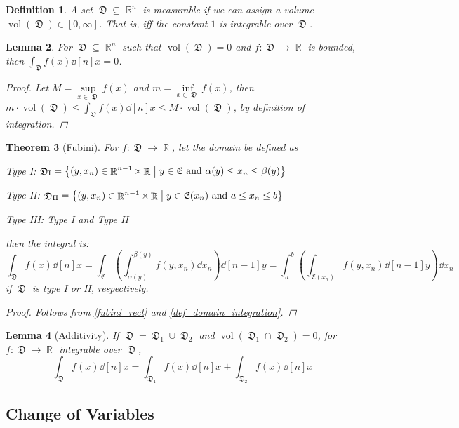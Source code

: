 \documentclass[12pt]{article}
\newcommand{\set}[2]{\left\{{#1}\;\middle|\;{#2}\right\}}
\DeclareMathOperator{\R}{\mathbb{R}}
\DeclareMathOperator{\D}{\mathfrak{D}}
\DeclareMathOperator{\vol}{vol}
\newtheorem{theorem}{Theorem}[subsection]
\newtheorem{definition}[theorem]{Definition}
\newtheorem{lemma}[theorem]{Lemma}
\begin{document}
\begin{definition}
  A set $\D\subseteq\R^n$ is measurable if we can assign a volume $\vol(\D)\in[0,\infty]$. That is, iff the constant $1$ is integrable over $\D$.
\end{definition}

\begin{lemma}
  For $\D\subseteq\R^n$ such that $\vol(\D)=0$ and $f:\D\to\R$ is bounded, then $\displaystyle\int_{\D}f(x)\dd[n]{x}=0$.
  \begin{proof}
    Let $M=\sup\limits_{x\in\D}f(x)$ and $m=\inf\limits_{x\in\D}f(x)$, then $\displaystyle m\cdot\vol(\D)\leq \int_{\D}f(x)\dd[n]{x}\leq M\cdot \vol(\D)$, by definition of integration.
  \end{proof}
\end{lemma}

\begin{theorem}[Fubini]
  For $f:\D\to\R$, let the domain be defined as
  \begin{compactitem}
    \item Type I: $\D_\textup{I}=\set{(y,x_n)\in\R^{n-1}\times\R}{y\in \mathfrak{E}\text{ and }\alpha(y)\leq x_n\leq \beta(y)}$
    \item Type II: $\D_\textup{II}=\set{(y,x_n)\in\R^{n-1}\times\R}{y\in \mathfrak{E}(x_n)\text{ and }a\leq x_n\leq b}$
    \item Type III: Type I and Type II
  \end{compactitem}
  then the integral is: $$\int_{\D} f(x)\dd[n]{x}=\int_{\mathfrak{E}}\left(\int_{\alpha(y)}^{\beta(y)}f(y,x_n)\dd{x_n}\right)\dd[n-1]{y}=\int_a^b\left(\int_{\mathfrak{E}(x_n)}f(y,x_n)\dd[n-1]{y}\right)\dd{x_n}$$ if $\D$ is type I or II, respectively.
  \begin{proof}
    Follows from \ref{fubini_rect} and \ref{def_domain_integration}.
  \end{proof}
\end{theorem}

\begin{lemma}[Additivity]
  If $\D=\D_1\cup\D_2$ and $\vol(\D_1\cap\D_2)=0$, for $f:\D\to\R$ integrable over $\D$, $$\int_{\D}f(x)\dd[n]{x}=\int_{\D_1}f(x)\dd[n]{x}+\int_{\D_2}f(x)\dd[n]{x}$$
\end{lemma}

\pagebreak

\subsection{Change of Variables}
\end{document}
